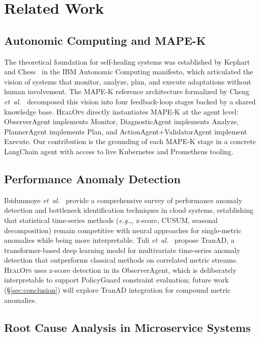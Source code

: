 \documentclass[journal,10pt,twoside]{IEEEtran}
\newcommand{\HealOps}{\textsc{HealOps}}
\newcommand{\etal}{\textit{et~al.}}
\newcommand{\eg}{\textit{e.g.},}
\begin{document}
\section{Related Work}\label{sec:related}

\subsection{Autonomic Computing and MAPE-K}

The theoretical foundation for self-healing systems was established by
Kephart and Chess~\cite{kephart2003vision} in the IBM Autonomic Computing
manifesto, which articulated the vision of systems that monitor, analyze,
plan, and execute adaptations without human involvement. The MAPE-K
reference architecture formalized by Cheng \etal~\cite{cheng2009run}
decomposed this vision into four feedback-loop stages backed by a shared
knowledge base. \HealOps{} directly instantiates MAPE-K at the agent
level: ObserverAgent implements Monitor, DiagnosticAgent implements
Analyze, PlannerAgent implements Plan, and ActionAgent+ValidatorAgent
implement Execute. Our contribution is the grounding of each MAPE-K
stage in a concrete LangChain agent with access to live Kubernetes and
Prometheus tooling.

\subsection{Performance Anomaly Detection}

Ibidunmoye \etal~\cite{ibidunmoye2015performance} provide a comprehensive
survey of performance anomaly detection and bottleneck identification
techniques in cloud systems, establishing that statistical time-series
methods (\eg, z-score, CUSUM, seasonal decomposition) remain competitive
with neural approaches for single-metric anomalies while being more
interpretable. Tuli \etal~\cite{tuli2021tranad} propose TranAD, a
transformer-based deep learning model for multivariate time-series
anomaly detection that outperforms classical methods on correlated
metric streams. \HealOps{} uses z-score detection in its ObserverAgent,
which is deliberately interpretable to support PolicyGuard constraint
evaluation; future work (\S\ref{sec:conclusion}) will explore TranAD
integration for compound metric anomalies.

\subsection{Root Cause Analysis in Microservice Systems}
\end{document}
